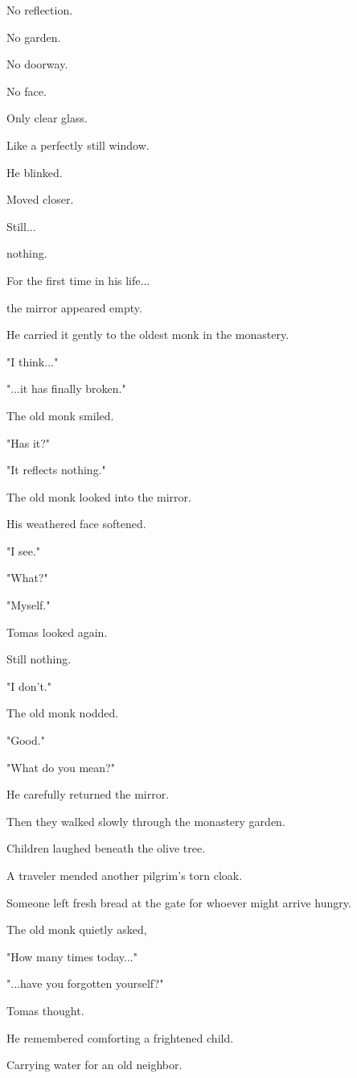 \documentclass[12pt,openany]{book}
\begin{document}
No reflection.

No garden.

No doorway.

No face.

Only clear glass.

Like a perfectly still window.

He blinked.

Moved closer.

Still...

nothing.

For the first time in his life...

the mirror appeared empty.

He carried it gently to the oldest monk in the monastery.

"I think..."

"...it has finally broken."

The old monk smiled.

"Has it?"

"It reflects nothing."

The old monk looked into the mirror.

His weathered face softened.

"I see."

"What?"

"Myself."

Tomas looked again.

Still nothing.

"I don't."

The old monk nodded.

"Good."

"What do you mean?"

He carefully returned the mirror.

Then they walked slowly through the monastery garden.

Children laughed beneath the olive tree.

A traveler mended another pilgrim's torn cloak.

Someone left fresh bread at the gate for whoever might arrive hungry.

The old monk quietly asked,

"How many times today..."

"...have you forgotten yourself?"

Tomas thought.

He remembered comforting a frightened child.

Carrying water for an old neighbor.
\end{document}
